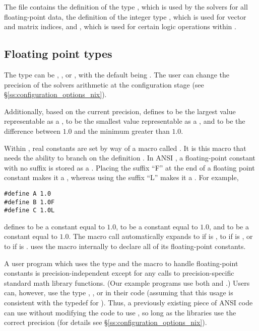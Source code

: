 %
The  file contains the definition of the type ,
which is used by the {\sundials} solvers for all floating-point data, the definition
of the integer type , which is used for vector and matrix indices,
and , which is used for certain logic operations within {\sundials}.


\subsection{Floating point types}

The type  can be , , or , with
the default being .
The user can change the precision of the {\sundials} solvers arithmetic at the
configuration stage (see \S\ref{ss:configuration_options_nix}).

Additionally, based on the current precision,  defines
 to be the largest value representable as a ,
 to be the smallest value representable as a , and
 to be the difference between $1.0$ and the minimum 
greater than $1.0$.

Within {\sundials}, real constants are set by way of a macro called
.  It is this macro that needs the ability to branch on the
definition .  In ANSI {\CC}, a floating-point constant with no
suffix is stored as a .  Placing the suffix ``F'' at the
end of a floating point constant makes it a , whereas using the suffix
``L'' makes it a .  For example,
\begin{verbatim}
#define A 1.0
#define B 1.0F
#define C 1.0L
\end{verbatim}
defines  to be a  constant equal to $1.0$,  to be a
 constant equal to $1.0$, and  to be a  constant
equal to $1.0$.  The macro call  automatically expands to 
if  is , to  if  is ,
or to  if  is .  {\sundials} uses the
 macro internally to declare all of its floating-point constants.

A user program which uses the type  and the  macro
to handle floating-point constants is precision-independent except for
any calls to precision-specific standard math library
functions.  (Our example programs use both  and
.)  Users can, however, use the type , , or
 in their code (assuming that this usage is consistent
with the typedef for ).  Thus, a previously existing
piece of ANSI {\CC} code can use {\sundials} without modifying the code
to use , so long as the {\sundials} libraries use the
correct precision (for details see \S\ref{ss:configuration_options_nix}).


